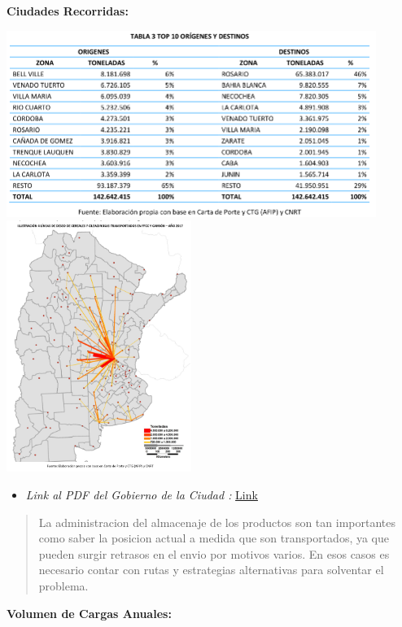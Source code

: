 \documentclass[
10pt, %
a4paper, %
oneside, %
headinclude,footinclude, %
BCOR5mm, %
]{scrartcl}
\begin{document}
\pagebreak

 \textbf{Ciudades Recorridas:}
 \begin{flushleft}
     \includegraphics[width=12cm, keepaspectratio]{images/cities.png}
     \includegraphics[width=6cm, keepaspectratio]{images/country_map.png}
 \end{flushleft}
  \begin{itemize}
    \item \textit{Link al PDF del Gobierno de la Ciudad :}
      \href{https://www.argentina.gob.ar/sites/default/files/transporte_terrestre_de_cereales_y_oleaginosas_2017_v1.pdf} {Link}
  \end{itemize}
  \begin{quotation}
    La administracion del almacenaje de los productos son tan importantes como
    saber la posicion actual a medida que son transportados, ya que pueden
    surgir retrasos en el envio por motivos varios. En esos casos es necesario
    contar con rutas y estrategias alternativas para solventar el problema.
  \end{quotation}
 \textbf{Volumen de Cargas Anuales:}
\end{document}
